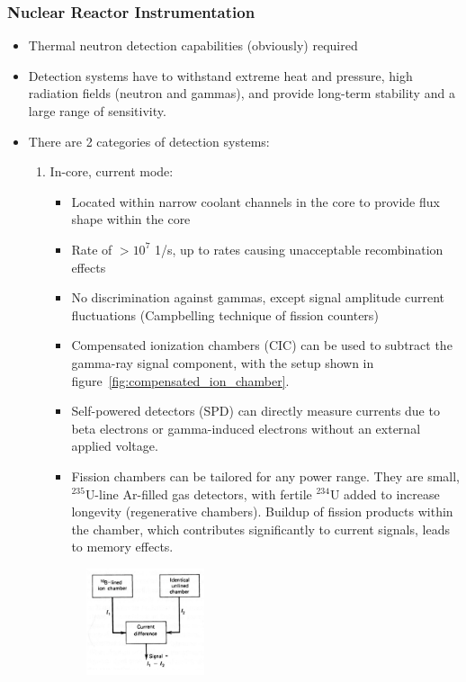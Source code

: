 \subsubsection{Nuclear Reactor Instrumentation}
\begin{itemize}
    \item Thermal neutron detection capabilities (obviously) required
    \item Detection systems have to withstand extreme heat and pressure, high radiation fields (neutron and gammas), and provide long-term stability and a large range of sensitivity.
    \item There are 2 categories of detection systems:
    \begin{enumerate}
        \item In-core, current mode:
        \begin{itemize}
            \item Located within narrow coolant channels in the core to provide flux shape within the core
            \item Rate of $>10^7$ 1/s, up to rates causing unacceptable recombination effects
            \item No discrimination against gammas, except signal amplitude current fluctuations (Campbelling technique of fission counters)
            \item Compensated ionization chambers (CIC) can be used to subtract the gamma-ray signal component, with the setup shown in figure~\ref{fig:compensated_ion_chamber}. 
            \item Self-powered detectors (SPD) can directly measure currents due to beta electrons or gamma-induced electrons without an external applied voltage.
            \item Fission chambers can be tailored for any power range. They are small, $^{235}$U-line Ar-filled gas detectors, with fertile $^{234}$U added to increase longevity (regenerative chambers). Buildup of fission products within the chamber, which contributes significantly to current signals, leads to memory effects. 
        \end{itemize}
        \begin{figure}[ht]
            \centering
            \includegraphics[width=0.35\textwidth]{images/compensated_ion_chamber.png}

\end{figure}
\end{enumerate}
\end{itemize}
